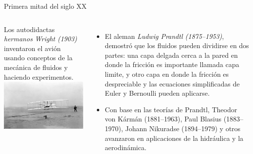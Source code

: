 \documentclass [xcolor=svgnames, t] {beamer}
\begin{document}
\begin{frame}{Primera mitad del siglo XX}
\begin{columns}
Los autodidactas \emph{hermanos Wright (1903)} inventaron el avión usando conceptos de la mecánica de fluidos y haciendo experimentos.\\
\centering
\includegraphics[width=1.1\textwidth]{wrig}
\vspace{-1cm}
\begin{itemize}
\item El aleman \emph{Ludwig Prandtl (1875–1953)}, demostró que los fluidos pueden dividirse en dos partes: una capa delgada cerca a la pared en donde la fricción es importante llamada capa limite, y otro capa en donde la fricción es despreciable y las ecuaciones simplificadas de Euler y Bernoulli pueden aplicarse.
\item Con base en las teorías de Prandtl, Theodor von Kármán (1881–1963), Paul Blasius (1883–1970), Johann Nikuradse (1894–1979) y otros avanzaron en aplicaciones de la hidráulica y la aerodinámica.
\end{itemize}
\end{columns}
\end{frame}
\end{document}

